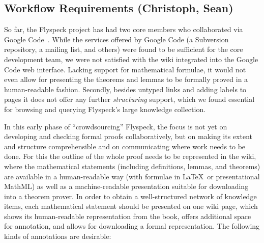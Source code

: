 \documentclass{llncs}
\begin{document}
\subsection{Workflow Requirements (Christoph, Sean)}
\label{sec:req}

So far, the Flyspeck project has had two core members who
collaborated via Google Code~\cite{flyspeck:web}.  While the services offered by Google
Code (a Subversion repository, a mailing list, and others) were found to be sufficient for
the core development team, we were not satisfied with the wiki integrated into the Google
Code web interface.  Lacking support for mathematical formulae, it would not even allow
for presenting the theorems and lemmas to be formally proved in a human-readable fashion.
Secondly, besides untyped links and adding labels to pages it does not offer any further
\emph{structuring} support, which we found essential for browsing and querying Flyspeck's
large knowledge collection.

In this early phase of ``crowdsourcing'' Flyspeck, the focus is not yet on developing and
checking formal proofs collaboratively, but on making its extent and structure
comprehensible and on communicating where work needs to be done.  For this the outline of
the whole proof needs to be represented in the wiki, where the mathematical
statements (including definitions, lemmas, and theorems) are available in a human-readable
way (with formulae in \LaTeX\ or presentational MathML) as well as a machine-readable
presentation suitable for downloading into a theorem prover.  In order to obtain a
well-structured network of knowledge items, each mathematical statement should be
presented on one wiki page, which shows its human-readable representation from the book,
offers additional space for annotation, and allows for downloading a formal
representation.  The following kinds of annotations are desirable:
\end{document}
